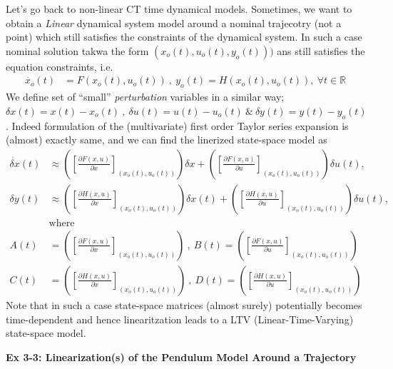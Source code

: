 \documentclass[twoside]{article}
\begin{document}
Let's go back to non-linear CT time dynamical models. Sometimes, 
we want to obtain a \textit{Linear} dynamical system model 
around a nominal trajecotry (not a point) which still satisfies the
constraints of the dynamical system. In such a case nominal solution 
takwa the form $(x_o(t),u_o(t),y_o(t)))$ ans still satisfies the equation constraints, i.e.
%
\begin{align*}
  \dot{x_o}(t) &= F(x_o(t),u_o(t)) \ , \  y_o(t) = H(x_o(t),u_o(t)) , \ \forall
                                        t \in \mathbb{R}
\end{align*}
%
We define set of ``small'' \textit{perturbation} variables in a
similar way; $\delta x(t)
= x(t) - x_o(t) \ , \ \delta u(t) = u(t) - u_o(t) \ \& \ \delta y(t) = y(t)
- y_o(t)$. Indeed formulation of the (multivariate) first order Taylor
series expansion is (almost) exactly same, and we can find the linerized state-space model as
%
\begin{align*}
  \dot{\delta x}(t) &\approx \left( \left[ \frac{\partial F(x,u)}{\partial x}
                      \right]_{(x_o(t),u_o(t))} \right) \delta x + \left( \left[ \frac{\partial F(x,u)}{\partial u}
                      \right]_{(x_o(t),u_o(t))} \right) \delta u(t)  , \\
  \delta y(t)  &\approx \left( \left[ \frac{\partial H(x,u)}{\partial x}
                      \right]_{(x_o(t),u_o(t))} \right) \delta x(t) + \left( \left[ \frac{\partial H(x,u)}{\partial u}
                      \right]_{(x_o(t),u_o(t))} \right) \delta u(t) , 
\\ 
&\mathrm{where}
\\
A(t) &= \left( \left[ \frac{\partial F(x,u)}{\partial x}
                      \right]_{(x_o(t),u_o(t))} \right) \ , \ B(t) = \left( \left[ \frac{\partial F(x,u)}{\partial u}
                      \right]_{(x_o(t),u_o(t))} \right)
\\
C(t) &= \left( \left[ \frac{\partial H(x,u)}{\partial x}
                      \right]_{(x_o(t),u_o(t))} \right) \ , \ D(t) = \left( \left[ \frac{\partial H(x,u)}{\partial u}
                      \right]_{(x_o(t),u_o(t))} \right)
\end{align*}
%
Note that in such a case state-space matrices (almost surely) potentially becomes
time-dependent and hence linearitzation leads to a LTV
(Linear-Time-Varying) state-space model. 

\vspace{6pt}

\textbf{Ex 3-3: Linearization(s) of the Pendulum Model Around a Trajectory}
\end{document}
